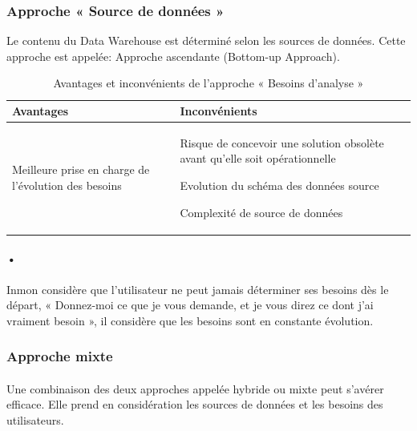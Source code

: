 \subsubsection{Approche « Source de données »}
Le contenu du Data Warehouse est déterminé selon les sources de données. Cette approche est appelée: Approche ascendante (Bottom-up Approach).

  \begin{flushleft}
	\begin{longtable}{|p{}|p{}|}
		\caption{Avantages et inconvénients de l'approche « Besoins d’analyse »} 
		\label{Transactionel vs descisionel}
		\\
		
		
		\hline 
		\textbf{Avantages} &
		\textbf{Inconvénients}
		\\
		
		\hline
		\endhead
		\hline
		\endfoot
		\hline
		 
		\begin{description}
		 \item Meilleure prise en charge de l’évolution des besoins
		 \end{description}
		  &
		 
	   \begin{description}
		\item  Risque de concevoir une solution obsolète avant qu’elle soit opérationnelle
		\item Evolution du schéma des données source
		\item Complexité de source de données
		\end{description}
		\\ 	
		\hline 
	\end{longtable} 
\end{flushleft}


\paragraph{•}
Inmon considère que l’utilisateur ne peut jamais déterminer ses besoins dès le départ, « Donnez-moi ce que je vous demande, et je vous direz ce dont j’ai vraiment besoin », il considère que les besoins sont en constante évolution.

\subsubsection{Approche mixte}
\paragraph{}
Une combinaison des deux approches appelée hybride ou mixte peut s’avérer efficace. Elle prend en considération les sources de données et les besoins des utilisateurs.\\

